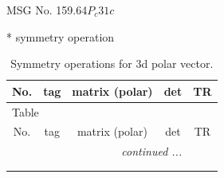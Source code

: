\documentclass[fleqn,8pt]{jsarticle}
\begin{document}
\setcounter{MaxMatrixCols}{32}

\renewcommand{\tablename}{Table~}
\renewcommand{\figurename}{Figure~}
\begin{center}
\LARGE
MSG No. 159.64\quad$P_{c}31c$
\end{center}
* symmetry operation
\renewcommand{\arraystretch}{1.3}
\begin{longtable}{ccccc}
\caption{Symmetry operations for 3d polar vector.}
 \\
 \hline \hline
No. & tag & matrix (polar) & det & TR \\ \hline \endfirsthead

\multicolumn{4}{l}{\tablename\ \thetable{}} \\
 \hline \hline
No. & tag & matrix (polar) & det & TR \\ \hline \endhead

 \hline \hline
\multicolumn{4}{r}{\footnotesize\it continued ...} \\ \endfoot

 \hline \hline
\multicolumn{4}{r}{} \\ \endlastfoot


\end{longtable}
\end{document}
